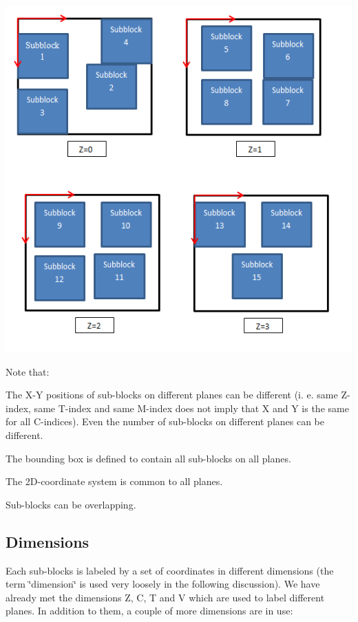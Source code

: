 \begin{DoxyImage}
\includegraphics[width=\textwidth,height=\textheight/2,keepaspectratio=true]{image_document_concept2.PNG}
\end{DoxyImage}
 Note that\+:
\begin{DoxyItemize}
\item The X-\/Y positions of sub-\/blocks on different planes can be different (i. e. same Z-\/index, same T-\/index and same M-\/index does not imply that X and Y is the same for all C-\/indices). Even the number of sub-\/blocks on different planes can be different.
\item The bounding box is defined to contain all sub-\/blocks on all planes.
\item The 2\+D-\/coordinate system is common to all planes.
\item Sub-\/blocks can be overlapping.
\end{DoxyItemize}

\subsection*{Dimensions}

Each sub-\/blocks is labeled by a set of coordinates in different dimensions (the term \char`\"{}dimension\char`\"{} is used very loosely in the following discussion). We have already met the dimensions \textquotesingle{}Z\textquotesingle{}, \textquotesingle{}C\textquotesingle{}, \textquotesingle{}T\textquotesingle{} and \textquotesingle{}V\textquotesingle{} which are used to label different planes. In addition to them, a couple of more dimensions are in use\+:

